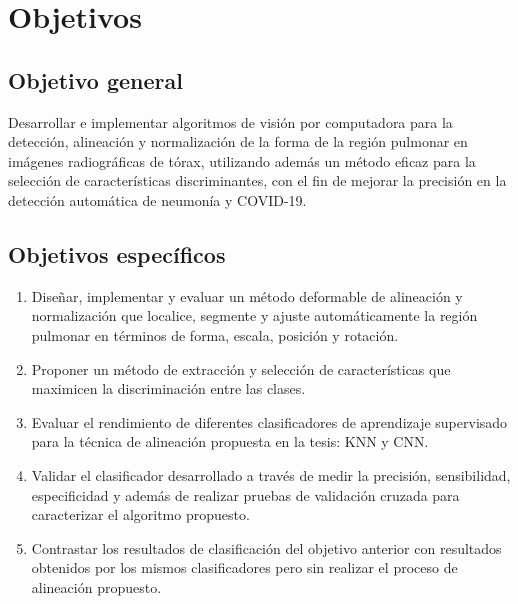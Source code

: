 \section*{Objetivos}

\subsection*{Objetivo general}

Desarrollar e implementar algoritmos de visión por computadora para la detección, alineación y normalización de la forma de la región pulmonar en imágenes radiográficas de tórax, utilizando además un método eficaz para la selección de características discriminantes, con el fin de mejorar la precisión en la detección automática de neumonía y COVID-19.

\subsection*{Objetivos específicos}

\begin{enumerate}[leftmargin=*]
    \item Diseñar, implementar y evaluar un método deformable de alineación y normalización que localice, segmente y ajuste automáticamente la región pulmonar en términos de forma, escala, posición y rotación.
    \item Proponer un método de extracción y selección de características que maximicen la discriminación entre las clases.
    \item Evaluar el rendimiento de diferentes clasificadores de aprendizaje supervisado para la técnica de alineación propuesta en la tesis: KNN y CNN.
    \item Validar el clasificador desarrollado a través de medir la precisión, sensibilidad, especificidad y además de realizar pruebas de validación cruzada para caracterizar el algoritmo propuesto.
    \item Contrastar los resultados de clasificación del objetivo anterior con resultados obtenidos por los mismos clasificadores pero sin realizar el proceso de alineación propuesto.
\end{enumerate}
